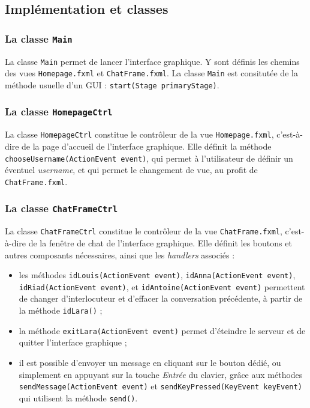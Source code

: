 \documentclass[10pt,a4paper]{article}
\begin{document}
\subsection{Implémentation et classes}
\subsubsection{La classe \texttt{Main}}

La classe \texttt{Main} permet de lancer l'interface graphique. Y sont définis les chemins des vues \texttt{Homepage.fxml} et \texttt{ChatFrame.fxml}. La classe \texttt{Main} est consitutée de la méthode usuelle d'un GUI : \texttt{start(Stage primaryStage)}.

\subsubsection{La classe \texttt{HomepageCtrl}}

La classe \texttt{HomepageCtrl} constitue le contrôleur de la vue \texttt{Homepage.fxml}, c'est-à-dire de la page d'accueil de l'interface graphique. Elle définit la méthode \texttt{chooseUsername(ActionEvent event)}, qui permet à l'utilisateur de définir un éventuel \textit{username}, et qui permet le changement de vue, au profit de \texttt{ChatFrame.fxml}.

\subsubsection{La classe \texttt{ChatFrameCtrl}}

La classe \texttt{ChatFrameCtrl} constitue le contrôleur de la vue \texttt{ChatFrame.fxml}, c'est-à-dire de la fenêtre de chat de l'interface graphique. Elle définit les boutons et autres composants nécessaires, ainsi que les \textit{handlers} associés :

\begin{itemize}
    \item les méthodes \texttt{idLouis(ActionEvent event)}, \texttt{idAnna(ActionEvent event)}, \texttt{idRiad(ActionEvent event)}, et \texttt{idAntoine(ActionEvent event)} permettent de changer d'interlocuteur et d'effacer la conversation précédente, à partir de la méthode \texttt{idLara()} ;
    \item la méthode \texttt{exitLara(ActionEvent event)} permet d'éteindre le serveur et de quitter l'interface graphique ;
    \item il est possible d'envoyer un message en cliquant sur le bouton dédié, ou simplement en appuyant sur la touche \textit{Entrée} du clavier, grâce aux méthodes \texttt{sendMessage(ActionEvent event)} et \texttt{sendKeyPressed(KeyEvent keyEvent)} qui utilisent la méthode \texttt{send()}.
\end{itemize}
\end{document}
